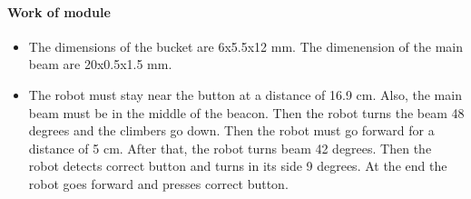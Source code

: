 	 \paragraph{Work of module}
	 
	 \begin{itemize}
	 
		 \item The dimensions of the bucket are 6x5.5x12 mm. The dimenension of the main beam are 20x0.5x1.5 mm.
	 
		 \item The robot must stay near the button at a distance of 16.9 cm. Also, the main beam must be in the middle of the beacon. Then the robot turns the beam 48 degrees and the climbers go down. Then the robot must go forward for a distance of 5 cm. After that, the robot turns beam 42 degrees. Then the robot detects correct button and turns in its side 9 degrees. At the end the robot goes forward and presses correct button.
	\end{itemize}
	\fillpage
